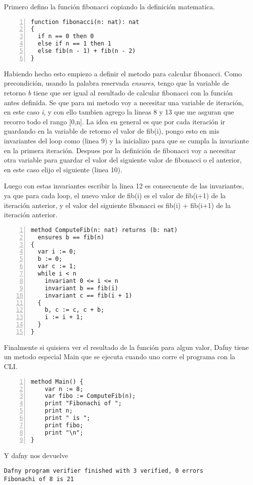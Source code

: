 \documentclass[runningheads]{llncs}
\begin{document}
Primero defino la función fibonacci copiando la definición matematica.
\begin{Verbatim}[numbers=left,xleftmargin=5mm]
function fibonacci(n: nat): nat
{
  if n == 0 then 0
  else if n == 1 then 1
  else fib(n - 1) + fib(n - 2)
}
\end{Verbatim}

Habiendo hecho esto empiezo a definir el metodo para calcular fibonacci.
Como precondición, usando la palabra reservada \textit{ensures}, tengo que la variable de retorno \textit{b} tiene que ser igual al resultado de calcular fibonacci con la función antes definida.
Se que para mi metodo voy a necesitar una variable de iteración, en este caso \textit{i}, y con ello tambien agrego la lineas 8 y 13 que me asguran que recorro todo el rango [0,n].
La idea en general es que por cada iteración ir guardando en la variable de retorno el valor de fib(i), pongo esto en mis invariantes del loop como (linea 9) y la inicializo para que se cumpla la invariante en la primera iteración. Despues por la definición de fibonacci voy a necesitar otra variable para guardar el valor del siguiente valor de fibonacci o el anterior, en este caso elijo el siguiente (linea 10).

Luego con estas invariantes escribir la linea 12 es consecuente de las invariantes, ya que para cada loop, el nuevo valor de fib(i) es el valor de fib(i+1) de la iteración anterior, y el valor del siguiente fibonacci es fib(i) + fib(i+1) de la iteración anterior.
\begin{Verbatim}[numbers=left,xleftmargin=5mm]
method ComputeFib(n: nat) returns (b: nat)
  ensures b == fib(n)
{
  var i := 0;
  b := 0;
  var c := 1;
  while i < n
    invariant 0 <= i <= n
    invariant b == fib(i)
    invariant c == fib(i + 1)
  {
    b, c := c, c + b;
    i := i + 1;
  }
}
\end{Verbatim}
Finalmente si quisiera ver el resultado de la función para algun valor, Dafny tiene un metodo especial Main que se ejecuta cuando uno corre el programa con la CLI.
\begin{Verbatim}[numbers=left,xleftmargin=5mm]
method Main() {
    var n := 8;
    var fibo := ComputeFib(n);
    print "Fibonachi of ";
    print n;
    print " is ";
    print fibo;
    print "\n";
}
\end{Verbatim}


Y dafny nos devuelve 
\begin{verbatim}
Dafny program verifier finished with 3 verified, 0 errors
Fibonachi of 8 is 21
\end{verbatim}
\end{document}
